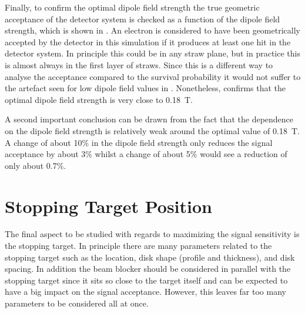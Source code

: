 \FigOptimESTDipoleAcceptanceVsDipole
Finally, to confirm the optimal dipole field strength the true geometric acceptance of the detector system is checked as a function of the dipole field strength, which is shown in .
An electron is considered to have been geometrically accepted by the detector in this simulation if it produces at least one hit in the detector system.
In principle this could be in any straw plane, but in practice this is almost always in the first layer of straws.
Since this is a different way to analyse the acceptance compared to the survival probability it would not suffer to the artefact seen for low dipole field values in .
Nonetheless,  confirms that the optimal dipole field strength is very close to 0.18~T.

A second important conclusion can be drawn from the fact that the dependence on the dipole field strength is relatively weak around the optimal value of 0.18~T.
A change of about 10\% in the dipole field strength only reduces the signal acceptance by about 3\% whilst a change of about 5\% would see a reduction of only about 0.7\%.


\section{Stopping Target Position}
The final aspect to be studied with regards to maximizing the signal sensitivity is the stopping target.
In principle there are many parameters related to the stopping target such as the location, disk shape (profile and thickness), and disk spacing.
In addition the beam blocker should be considered in parallel with the stopping target since it sits so close to the target itself and can be expected to have a big impact on the signal acceptance.
However, this leaves far too many parameters to be considered all at once.

